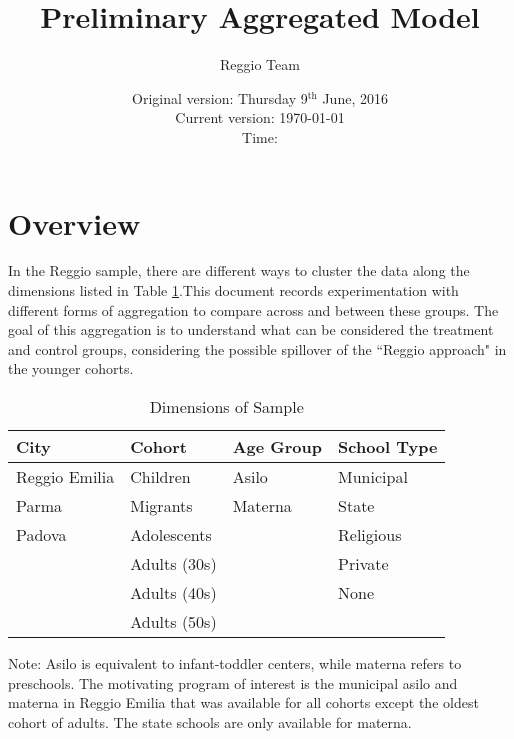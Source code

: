 \documentclass{article}
\begin{document}
\title{Preliminary Aggregated Model}
\author{Reggio Team}
\date{Original version: Thursday  9$^{\text{th}}$ June, 2016 \\ Current version: \today \\ \vspace{1em} Time: \currenttime}
\maketitle

\listoftables

\doublespacing

\section*{Overview}


In the Reggio sample, there are different ways to cluster the data along the dimensions listed in Table \ref{dimensions}.This document records experimentation with different forms of aggregation to compare across and between these groups. The goal of this aggregation is to understand what can be considered the treatment and control groups, considering the possible spillover of the ``Reggio approach" in the younger cohorts. 

\begin{table}
\caption{Dimensions of Sample} \label{dimensions}
\begin{center}
\begin{tabular}{l l l l}
\toprule
City 			& Cohort 			&	Age Group 	&	School Type \\
\midrule
Reggio Emilia 	& Children 		&	Asilo			&	Municipal \\
Parma		& Migrants 		&	Materna		&	State   \\
Padova		& Adolescents 		&				&	Religious \\
			& Adults (30s) 		&				&	Private \\
			& Adults (40s) 		&				&	None  \\
			& Adults (50s) 		&				& \\
\bottomrule
\end{tabular}
\end{center}
\raggedright
\footnotesize
Note: Asilo is equivalent to infant-toddler centers, while materna refers to preschools. The motivating program of interest is the municipal asilo and materna in Reggio Emilia that was available for all cohorts except the oldest cohort of adults. The state schools are only available for materna.
\end{table}
\end{document}
